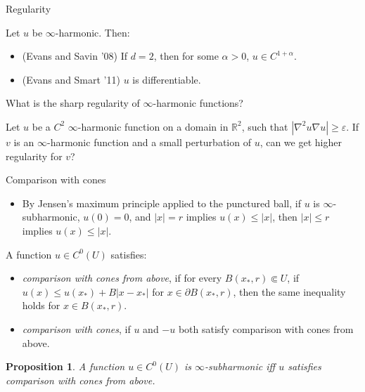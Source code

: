 \documentclass[10pt]{beamer}
\newcommand{\RR}{\mathbb{R}}
\newtheorem{proposition}{Proposition}
\begin{document}
\begin{frame}{Regularity}
\begin{theorem}
Let $u$ be $\infty$-harmonic. Then: 
\begin{itemize}
\item (Evans and Savin '08) If $d = 2$, then for some $\alpha > 0$, $u \in C^{1 + \alpha}$. 
\item (Evans and Smart '11) $u$ is differentiable. 
\end{itemize}
\end{theorem}

\begin{problem}
    What is the sharp regularity of $\infty$-harmonic functions?
\end{problem}

\begin{problem}
    Let $u$ be a $C^2$ $\infty$-harmonic function on a domain in $\RR^2$, such that $|\nabla^2 u \nabla u| \geq \varepsilon$.
    If $v$ is an $\infty$-harmonic function and a small perturbation of $u$, can we get higher regularity for $v$?
\end{problem}
\end{frame}

\begin{frame}{Comparison with cones}

\begin{itemize}
\item By Jensen's maximum principle applied to the punctured ball, if $u$ is $\infty$-subharmonic, $u(0) = 0$, and $|x| = r$ implies $u(x) \leq |x|$, then $|x| \leq r$ implies $u(x) \leq |x|$. 
\end{itemize}

\begin{definition}
A function $u \in C^0(U)$ satisfies: 
\begin{itemize}
\item \emph{comparison with cones from above}, if for every $B(x_*, r) \Subset U$, if $u(x) \leq u(x_*) + B|x - x_*|$ for $x \in \partial B(x_*, r)$, then the same inequality holds for $x \in B(x_*, r)$.
\item \emph{comparison with cones}, if $u$ and $-u$ both satisfy comparison with cones from above. 
\end{itemize}
\end{definition}

\begin{proposition}
A function $u \in C^0(U)$ is $\infty$-subharmonic iff $u$ satisfies comparison with cones from above.
\end{proposition}
\end{frame}
\end{document}
